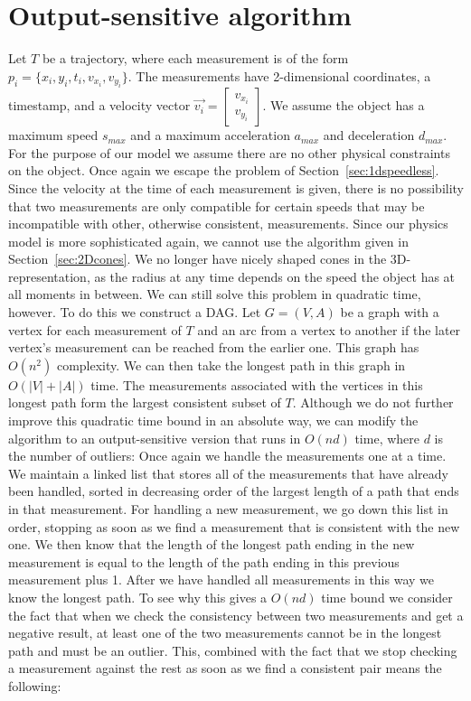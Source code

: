 \documentclass{article}
\begin{document}
\section{Output-sensitive algorithm}
Let \(T\) be a trajectory, where each measurement is of the form \(p_i=\{x_i,y_i,t_i,v_{x_i},v_{y_i}\}\). The measurements have 2-dimensional coordinates, a timestamp, and a velocity vector $\vec{v_i}= \begin{bmatrix} v_{x_i} \\ v_{y_i} \end{bmatrix}$. We assume the object has a maximum speed \(s_{max}\) and a maximum acceleration \(a_{max}\) and deceleration \(d_{max}\). For the purpose of our model we assume there are no other physical constraints on the object.
Once again we escape the problem of Section~\ref{sec:1dspeedless}. Since the velocity at the time of each measurement is given, there is no possibility that two measurements are only compatible for certain speeds that may be incompatible with other, otherwise consistent, measurements.
Since our physics model is more sophisticated again, we cannot use the algorithm given in Section~\ref{sec:2Dcones}. We no longer have nicely shaped cones in the 3D-representation, as the radius at any time depends on the speed the object has at all moments in between.
We can still solve this problem in quadratic time, however. To do this we construct a DAG. Let \(G=(V,A)\) be a graph with a vertex for each measurement of \(T\) and an arc from a vertex to another if the later vertex's measurement can be reached from the earlier one. This graph has \(O(n^2)\) complexity. We can then take the longest path in this graph in \(O(|V|+|A|)\) time. The measurements associated with the vertices in this longest path form the largest consistent subset of \(T\).
Although we do not further improve this quadratic time bound in an absolute way, we can modify the algorithm to an output-sensitive version that runs in \(O(nd)\) time, where \(d\) is the number of outliers:
Once again we handle the measurements one at a time. We maintain a linked list that stores all of the measurements that have already been handled, sorted in decreasing order of the largest length of a path that ends in that measurement. For handling a new measurement, we go down this list in order, stopping as soon as we find a measurement that is consistent with the new one. We then know that the length of the longest path ending in the new measurement is equal to the length of the path ending in this previous measurement plus 1. After we have handled all measurements in this way we know the longest path.
To see why this gives a \(O(nd)\) time bound we consider the fact that when we check the consistency between two measurements and get a negative result, at least one of the two measurements cannot be in the longest path and must be an outlier. This, combined with the fact that we stop checking a measurement against the rest as soon as we find a consistent pair means the following:
\end{document}
